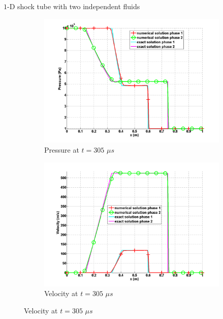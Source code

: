 \documentclass[xcolor=dvipsnames,10pt]{beamer}
\begin{document}
\begin{frame}{$1$-D shock tube with two independent fluids}
\begin{figure}
        \begin{subfigure}[b]{0.37\textwidth}
                \centering
                \includegraphics[width=\textwidth]{../figures/SEM/two_phases_pressure.png}
                \caption{Pressure at $t=305$ $\mu s$}
        \end{subfigure}%
        \begin{subfigure}[b]{0.37\textwidth}
                \centering
                \includegraphics[width=\textwidth]{../figures/SEM/two_phases_velocity.png}
                \caption{Velocity at $t=305$ $\mu s$}
        \end{subfigure}%


\end{figure}
\end{frame}
\end{document}

